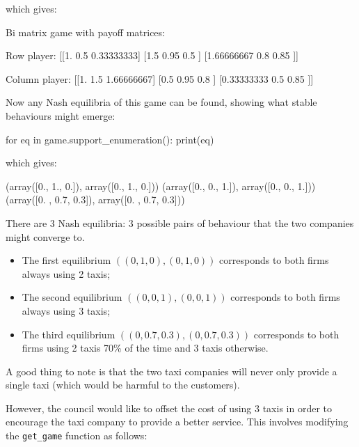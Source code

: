 which gives:

\begin{pyout}
Bi matrix game with payoff matrices:

Row player:
[[1.         0.5        0.33333333]
 [1.5        0.95       0.5       ]
 [1.66666667 0.8        0.85      ]]

Column player:
[[1.         1.5        1.66666667]
 [0.5        0.95       0.8       ]
 [0.33333333 0.5        0.85      ]]
\end{pyout}

Now any Nash equilibria of this game can be found, showing what stable
behaviours might emerge:

\begin{pyin}
for eq in game.support_enumeration():
    print(eq)
\end{pyin}


which gives:

\begin{pyout}
(array([0., 1., 0.]), array([0., 1., 0.]))
(array([0., 0., 1.]), array([0., 0., 1.]))
(array([0. , 0.7, 0.3]), array([0. , 0.7, 0.3]))
\end{pyout}

There are 3 Nash equilibria: 3 possible pairs of behaviour that the two
companies might converge to.

\begin{itemize}
    \item The first equilibrium \(((0, 1, 0), (0, 1, 0))\) corresponds to both
          firms always using 2 taxis;
    \item The second equilibrium \(((0, 0, 1), (0, 0, 1))\) corresponds to both
          firms always using 3 taxis;
    \item The third equilibrium \(((0, 0.7, 0.3), (0, 0.7, 0.3))\) corresponds to
          both firms using 2 taxis 70\% of the time and 3 taxis otherwise.
\end{itemize}

A good thing to note is that the two taxi companies will never only provide a
single taxi (which would be harmful to the customers).

However, the council would like to offset the cost of using 3 taxis in order to
encourage the taxi company to provide a better service. This involves modifying
the \texttt{get_game} function as follows:

